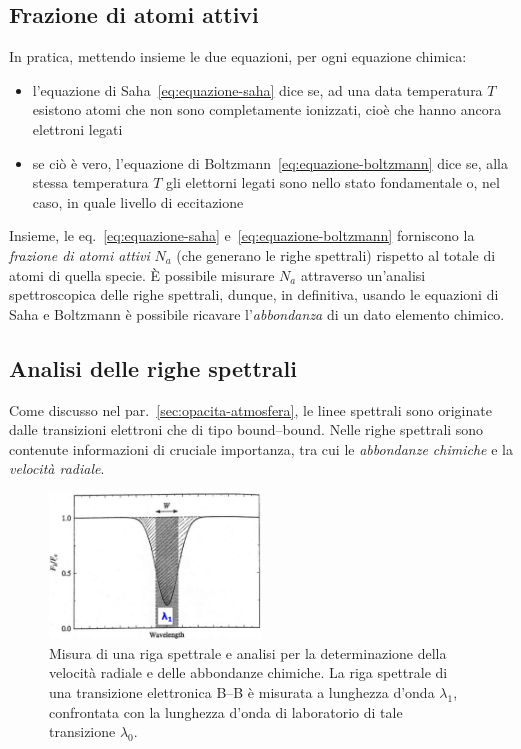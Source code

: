 \subsection{Frazione di atomi attivi}\label{sec:frazione-atomi-attivi}
In pratica, mettendo insieme le due equazioni, per ogni equazione chimica:
\begin{itemize}
    \item l'equazione di Saha~\eqref{eq:equazione-saha} dice se, ad una data temperatura $T$ esistono atomi che non sono completamente ionizzati, cioè che hanno ancora elettroni legati
    \item se ciò è vero, l'equazione di Boltzmann~\eqref{eq:equazione-boltzmann} dice se, alla stessa temperatura $T$ gli elettorni legati sono nello stato fondamentale o, nel caso, in quale livello di eccitazione
\end{itemize}
Insieme, le eq.~\eqref{eq:equazione-saha} e~\eqref{eq:equazione-boltzmann} forniscono la \emph{frazione di atomi attivi} $N_a$ (che generano le righe spettrali) rispetto al totale di atomi di quella specie. È possibile misurare $N_a$ attraverso un'analisi spettroscopica delle righe spettrali, dunque, in definitiva, usando le equazioni di Saha e Boltzmann è possibile ricavare l'\emph{abbondanza} di un dato elemento chimico. 

\subsection{Analisi delle righe spettrali}
Come discusso nel par.~\ref{sec:opacita-atmosfera}, le linee spettrali sono originate dalle transizioni elettroni che di tipo bound--bound. Nelle righe spettrali sono contenute informazioni di cruciale importanza, tra cui le \emph{abbondanze chimiche} e la \emph{velocità radiale}.

\begin{figure}
    \centering
    \includegraphics[width=0.5\textwidth]{immagini/righe-spettrali.png}
    \caption{Misura di una riga spettrale e analisi per la determinazione della velocità radiale e delle abbondanze chimiche. La riga spettrale di una transizione elettronica B--B è misurata a lunghezza d'onda $\lambda_1$, confrontata con la lunghezza d'onda di laboratorio di tale transizione $\lambda_0$.}
    \label{fig:righe-spettrali}
    
\end{figure}

